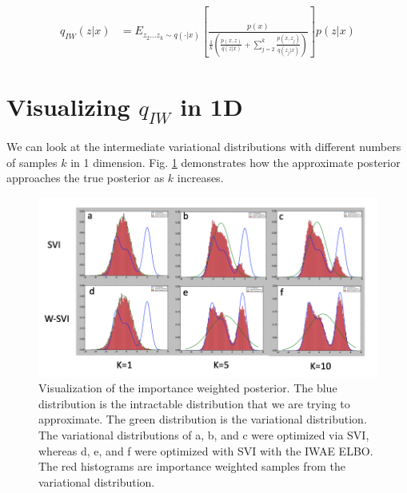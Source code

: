 \documentclass{article} %
\begin{document}
\begin{align} 
    q_{IW}(z|x) &= E_{z_{2}...z_{k} \sim q(\cdot |x)} \left[ \frac{p(x)}{  \frac{1}{k} \left( \frac{p(x,z)}{q(z|x)}+ \sum_{j=2}^k \frac{p(x,z_j)}{q(z_j|x)} \right) } \right] p(z|x) \label{marg} %
\end{align}




\section{Visualizing \texorpdfstring{$q_{IW}$}{} in 1D}

We can look at the intermediate variational distributions with different numbers of samples $k$ in 1 dimension. Fig. \ref{viz} demonstrates how the approximate posterior approaches the true posterior as $k$ increases. 

\begin{figure}[H]
  \centering
      \includegraphics[width=1.\textwidth]{figs/posteriors.png}
  \caption{Visualization of the importance weighted posterior. The blue distribution is the intractable distribution that we are trying to approximate. The green distribution is the variational distribution. The variational distributions of a, b, and c were optimized via SVI, whereas d, e, and f were optimized with SVI with the IWAE ELBO. The red histograms are importance weighted samples from the variational distribution.}
  \label{viz}
\end{figure}




        
\end{document}
